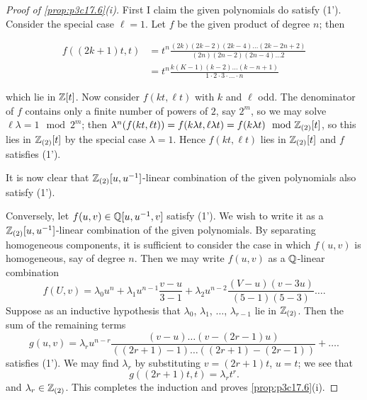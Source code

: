 \documentclass[../main]{subfiles}
\begin{document}
\begin{proof}[Proof of \ref{prop:p3c17.6}(i)]
First I claim the given polynomials do satisfy (1'). Consider the special case $\ell = 1$. Let $f$ be the given product of degree $n$; then

\begin{align*}
f((2k + 1)t, t) & = t^n \frac {(2k)(2k - 2)(2k - 4) \ldots (2k - 2n + 2)} {(2n)(2n-2)(2n-4)\ldots2} \\ & = t^n \frac {k(K - 1)(k - 2)\ldots (k - n + 1)} {1 \cdot 2 \cdot 3 \cdot \ldots \cdot n}
\end{align*}

which lie in $\mathbb{Z}[t]$. Now consider $f(kt, \ell t)$ with $k$ and $\ell$ odd. The denominator of $f$ contains only a finite number of powers of $2$, say $2^m$, so we may solve $\ell \lambda = 1 \mod 2^m$; then $\lambda^n(f(kt, \ell t)) = f(k \lambda t, \ell \lambda t) = f(k \lambda t) \mod {\mathbb{Z}}_{(2)}[t]$, so this lies in $\mathbb{Z}_{(2)}[t]$ by the special case $\lambda = 1$. Hence $f(kt, \ell t)$ lies in $\mathbb{Z}_{(2)}[t]$ and $f$ satisfies (1').

It is now clear that $\mathbb{Z}_{(2)}[u, u^{-1}]$-linear combination of the given polynomials also satisfy (1').

Conversely, let $f(u, v) \in \mathbb{Q}[u, u^{-1}, v]$ satisfy (1'). We wish to write it as a $\mathbb{Z}_{(2)}[u, u^{-1}]$-linear combination of the given polynomials. By separating homogeneous components, it is sufficient to consider the case in which $f(u, v)$ is homogeneous, say of degree $n$. Then we may write $f(u, v)$ as a $\mathbb{Q}$-linear combination \[f(U, v) = \lambda_0 u^n + \lambda_1 u^{n - 1} \frac {v - u} {3 - 1} + \lambda_2 u^{n - 2} \frac {(V - u)(v - 3u)} {(5 - 1)(5 - 3)} \ldots.\] Suppose as an inductive hypothesis that $\lambda_0$, $\lambda_1$, $\ldots$, $\lambda_{r - 1}$ lie in $\mathbb{Z}_{(2)}$. Then the sum of the remaining terms \[g(u,v) = \lambda_r u^{n - r} \frac {(v - u) \ldots (v - (2r - 1)u)} {((2r + 1) - 1) \ldots ((2r + 1) - (2r - 1))} + \ldots.\] satisfies (1'). We may find $\lambda_r$ by substituting $v = (2r + 1)t$, $u = t$; we see that \[g((2r + 1)t, t) = \lambda_r t^r.\] and $\lambda_r \in \mathbb{Z}_{(2)}$. This completes the induction and proves \ref{prop:p3c17.6}(i).
\end{proof}
\end{document}
